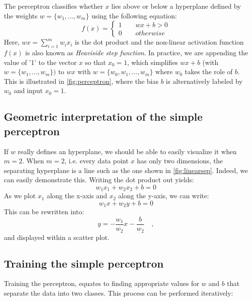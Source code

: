 The perceptron classifies whether $x$ lies above or below a hyperplane defined by the weights $w=\{w_1, \ldots, w_m\}$ using the following equation:
%
\begin{equation} \label{eq:heaviside}
f(x)=\begin{cases}
1 \qquad wx+b > 0\\
0 \qquad otherwise
\end{cases}
\end{equation}
%
Here, $wx=\sum_{i=1}^mw_ix_i$ is the dot product and the non-linear activation function $f(x)$ is also known as \textsl{Heaviside step function}. In practice, we are appending the value of '1' to the vector $x$ so that $x_0=1$, which simplifies $wx+b$ (with $w=\{w_1, \ldots, w_m\})$ to $wx$ with $w=\{w_0, w_1, \ldots, w_m\}$ where $w_0$ takes the role of $b$. This is illustrated in \cref{fig:perceptron}, where the bias $b$ is alternatively labeled by $w_0$ and input $x_0=1$.

\subsection{Geometric interpretation of the simple perceptron}

If $w$ really defines an hyperplane, we should be able to easily visualize it when $m=2$. When $m=2$, i.e. every data point $x$ has only two dimensions, the separating hyperplane is a line such as the one shown in \cref{fig:linearsep}.
Indeed, we can easily demonstrate this. Writing the dot product out yields:
\begin{equation}
w_1x_1+w_2x_2+b=0
\end{equation}
As we plot $x_1$ along the x-axis and $x_2$ along the y-axis, we can write:
\begin{equation}
w_1x+w_2y+b=0
\end{equation}
This can be rewritten into:
\begin{equation}
y=-\frac{w_1}{w_2}x-\frac{b}{w_2}\quad ,
\end{equation}
and displayed within a scatter plot.

\subsection{Training the simple perceptron}

Training the perceptron, equates to finding appropriate values for $w$ and $b$ that separate the data into two classes. This process can be performed iteratively:

